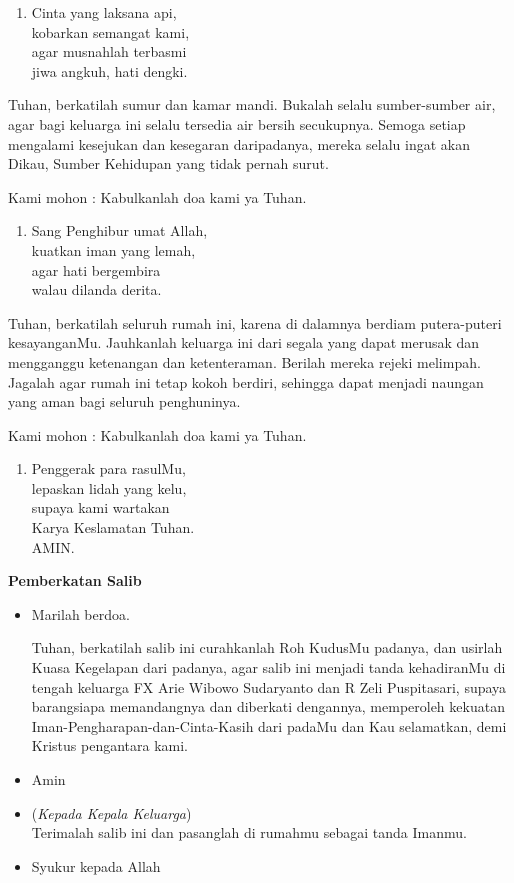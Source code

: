 \documentclass[12pt,twoside,anypage]{scrbook}
\makeatletter
\newcommand{\subjudul}[1]{%
  {\parindent \z@ \normalfont
    \interlinepenalty\@M \bfseries #1\par\nobreak \vskip 20\p@ }}
\renewenvironment{description}
               {\list{}{\labelwidth\z@ \itemindent-\leftmargin
                        \let\makelabel\descriptionlabel}}
               {\endlist}
\renewcommand*\descriptionlabel[1]{\hspace\labelsep 
                                \normalfont\bfseries #1 }
\newcommand{\doa}[2]{%
  \begin{description}
  \item[Doa untuk #1] #2
   
   Kami mohon : Kabulkanlah doa kami ya Tuhan.
  \end{description}
}
\newcommand{\bait}[1]{%
  \begin{enumerate}
  \slshape
  \setcounter{enumi}{\value{urut}}
  \item #1
  \setcounter{urut}{\value{enumi}}
  \end{enumerate}	
}
\newcommand{\BU}[1]{\begin{itemize} \item[U:] #1 \end{itemize}}
\newcommand{\BI}[1]{\begin{itemize} \item[I:] #1 \end{itemize}}
\newcommand{\keluarga}{FX Arie Wibowo Sudaryanto dan R Zeli Puspitasari\xspace}
\makeatother
\begin{document}
\bait{Cinta yang laksana api,\\ kobarkan semangat kami,\\ agar musnahlah terbasmi\\ jiwa angkuh, hati dengki.}

\doa{sumur dan kamar mandi}{
Tuhan, berkatilah sumur dan kamar mandi. Bukalah selalu sumber-sumber air, agar bagi keluarga ini selalu tersedia air bersih secukupnya. Semoga setiap mengalami kesejukan dan kesegaran daripadanya, mereka selalu ingat akan Dikau, Sumber Kehidupan yang tidak pernah surut.}

\bait{Sang Penghibur umat Allah, \\kuatkan iman yang lemah,\\ agar hati bergembira \\walau dilanda derita.}

\doa{seluruh dan sekeliling rumah}{
Tuhan, berkatilah seluruh rumah ini, karena di dalamnya berdiam putera-puteri kesayanganMu. Jauhkanlah keluarga ini dari segala yang dapat merusak dan mengganggu ketenangan dan ketenteraman. Berilah mereka rejeki melimpah. Jagalah agar rumah ini tetap kokoh berdiri, sehingga dapat menjadi naungan yang aman bagi seluruh penghuninya.}

\bait{Penggerak para rasulMu,\\ lepaskan lidah yang kelu,\\ supaya kami wartakan\\ Karya Keslamatan Tuhan.\\ AMIN.}

\subjudul{Pemberkatan Salib}


\BI{Marilah berdoa.

Tuhan, berkatilah salib ini \Cross {~}curahkanlah Roh KudusMu padanya, dan usirlah Kuasa Kegelapan dari padanya, agar salib ini menjadi tanda kehadiranMu di tengah keluarga \keluarga , supaya barangsiapa memandangnya dan diberkati dengannya, memperoleh kekuatan Iman-Pengharapan-dan-Cinta-Kasih dari padaMu dan Kau selamatkan, demi Kristus pengantara kami.}
\BU{Amin}
\BI{(\textit{Kepada Kepala Keluarga})\\
Terimalah salib ini dan pasanglah di rumahmu sebagai tanda Imanmu.}
\BU{Syukur kepada Allah}
\end{document}
